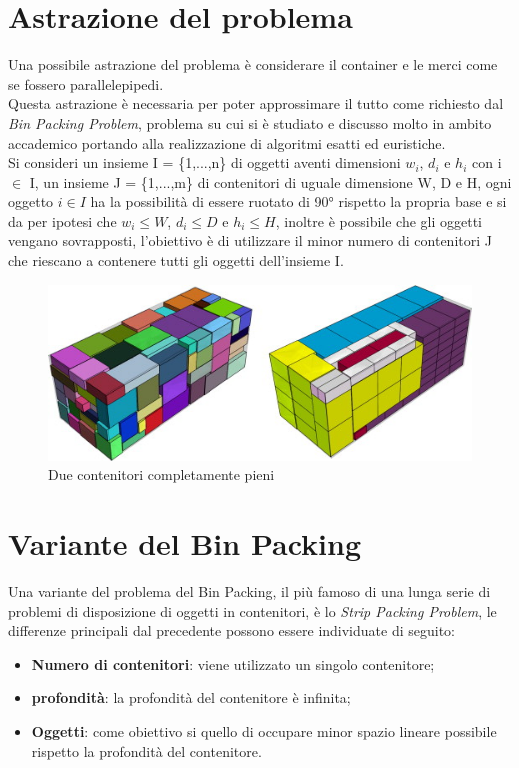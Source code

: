 \section{Astrazione del problema}
Una possibile astrazione del problema è considerare il container e le merci come se fossero parallelepipedi.\\
Questa astrazione è necessaria per poter approssimare il tutto come richiesto dal \textit{Bin Packing Problem}, problema su cui si è studiato e discusso molto in ambito accademico portando alla realizzazione di algoritmi esatti ed euristiche.\\
Si consideri un insieme I = \{1,...,n\} di oggetti aventi dimensioni $w_{i}$, $d_{i}$ e $h_{i}$ con i $\in$ I, un insieme J = \{1,...,m\} di contenitori di uguale dimensione W, D e H, ogni oggetto $i \in I$ ha la possibilità di essere ruotato di 90° rispetto la propria base e si da per ipotesi che $w_{i} \leq W$, $d_{i} \leq D$ e $h_{i} \leq H$, inoltre è possibile che gli oggetti vengano sovrapposti, l'obiettivo è di utilizzare il minor numero di contenitori J che riescano a contenere tutti gli oggetti dell'insieme I.
\begin{figure}[H]
	\begin{center} \includegraphics[scale=0.8]{figures/bin_packing}
		\caption[Contenitori Bin Packing]{Due contenitori completamente pieni}  
	\end{center}
\end{figure}

\section{Variante del Bin Packing}
Una variante del problema del Bin Packing, il più famoso di una lunga serie di problemi di disposizione di oggetti in contenitori, è lo \textit{Strip Packing Problem}, le differenze principali dal precedente possono essere individuate di seguito:
\begin{itemize}
	\item \textbf{Numero di contenitori}: viene utilizzato un singolo contenitore;
	\item \textbf{profondità}: la profondità del contenitore è infinita;
	\item \textbf{Oggetti}: come obiettivo si quello di occupare minor spazio lineare possibile rispetto la profondità del contenitore.
\end{itemize}
